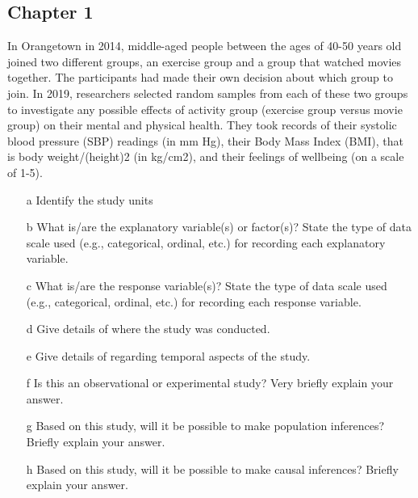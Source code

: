 \documentclass{article}
\theoremstyle{plain}
\theoremstyle{definition}
\theoremstyle{definition}
\begin{document}
\subsection{Chapter 1}
\begin{preamble}
In Orangetown in 2014, middle-aged people between the ages of 40-50 years old joined two different groups, an exercise group and a group that watched movies together. The participants had made their own decision about which group to join. In 2019, researchers selected random samples from each of these two groups to investigate any possible effects of activity group (exercise group versus movie group) on their mental and physical health. They took records of their systolic blood pressure (SBP) readings (in mm Hg), their Body Mass Index (BMI), that is body weight/(height)2 (in kg/cm2), and their feelings of wellbeing (on a scale of 1-5).
\end{preamble}
\begin{question}    
    \begin{itemize}
        \item[a] Identify the study units
        \item[b] What is/are the explanatory variable(s) or factor(s)? State the type of data scale used (e.g.,
        categorical, ordinal, etc.) for recording each explanatory variable.
        \item[c] What is/are the response variable(s)? State the type of data scale used (e.g., categorical, ordinal, etc.)
        for recording each response variable.
        \item[d] Give details of where the study was conducted.
        \item[e] Give details of regarding temporal aspects of the study.
        \item[f] Is this an observational or experimental study? Very briefly explain your answer.
        \item[g] Based on this study, will it be possible to make population inferences? Briefly explain your answer.
        \item[h] Based on this study, will it be possible to make causal inferences? Briefly explain your answer.
    \end{itemize}
\end{question}
\end{document}
